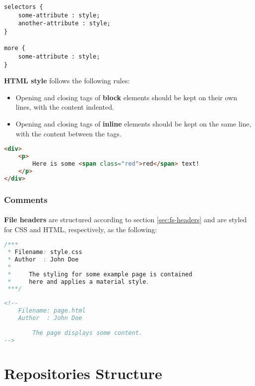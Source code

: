 \documentclass{article}
\begin{document}
    \begin{lstlisting}
selectors {
    some-attribute : style;
    another-attribute : style;
}

more {
    some-attribute : style;
}
    \end{lstlisting}

    \textbf{HTML style} follows the following rules:

    \begin{itemize}
        \item Opening and closing tags of \textbf{block} elements should be kept
            on their own lines, with the content indented.
        \item Opening and closing tags of \textbf{inline} elements should be
            kept on the same line, with the content between the tags.
    \end{itemize}

    \begin{lstlisting}[language=html]
<div>
    <p>
        Here is some <span class="red">red</span> text!
    </p>
</div>
    \end{lstlisting}

    \subsubsection{Comments}
    \label{sec:ls-html-com}

    \paragraph{}
    \textbf{File headers} are structured according to section
    \ref{sec:fs-headers} and are styled for CSS and HTML, respectively, as
    the following:

    \begin{lstlisting}[language=java]
/***
 * Filename: style.css
 * Author  : John Doe
 *
 *     The styling for some example page is contained
 *     here and applies a material style.
 ***/
    \end{lstlisting}

    \begin{lstlisting}[language=html]
<!--
    Filename: page.html
    Author  : John Doe
    
        The page displays some content.
-->
    \end{lstlisting}

    \newpage

    \section{Repositories Structure}
    \label{sec:rs}
\end{document}
